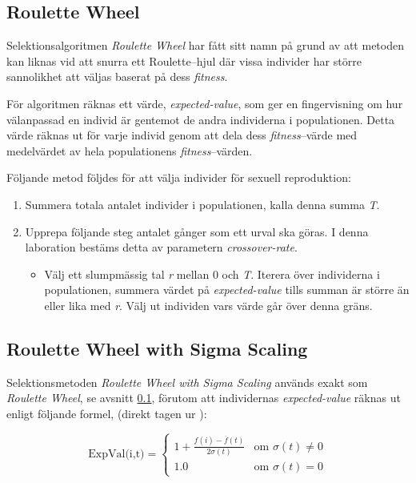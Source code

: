 \documentclass[titlepage, a4paper, 12pt]{article}
\begin{document}
\subsection{Roulette Wheel}\label{sec:roulette-wheel}
Selektionsalgoritmen \textit{Roulette Wheel} har fått sitt namn på
grund av att metoden kan liknas vid att snurra ett Roulette–hjul där
vissa individer har större sannolikhet att väljas baserat på dess
\textit{fitness}.

För algoritmen räknas ett värde, \textit{expected-value}, som ger en
fingervisning om hur välanpassad en individ är gentemot de andra
individerna i populationen. Detta värde räknas ut för varje individ
genom att dela dess \textit{fitness}–värde med medelvärdet av hela
populationens \textit{fitness}–värden.

Följande metod följdes för att välja individer för sexuell
reproduktion:

\begin{enumerate}
\item Summera totala antalet individer i populationen, kalla denna
  summa \textit{T}.
\item Upprepa följande steg antalet gånger som ett urval ska göras. I
  denna laboration bestäms detta av parametern
  \textit{crossover-rate}.
  \begin{itemize}
  \item Välj ett slumpmässig tal \textit{r} mellan 0 och
    \textit{T}. Iterera över individerna i populationen, summera
    värdet på \textit{expected-value} tills summan är större än eller
    lika med \textit{r}. Välj ut individen vars värde går över denna gräns.
  \end{itemize}
\end{enumerate}

\subsection{Roulette Wheel with Sigma Scaling}
Selektionsmetoden \textit{Roulette Wheel with Sigma Scaling} används
exakt som \textit{Roulette Wheel}, se avsnitt
\ref{sec:roulette-wheel}, förutom att individernas
\textit{expected-value} räknas ut enligt följande formel, (direkt
tagen ur \cite{gen-intro}):

\begin{displaymath}
  \textrm{ExpVal(i,t)} = \left\{ \begin{array}{ll}
      1 + \frac{f(i) - \overline{f}(t)}{2\sigma(t)} & \textrm{om } \sigma(t) \neq 0 \\
      1.0 & \textrm{om } \sigma(t) = 0
    \end{array} \right.
\end{displaymath}
  
\end{document}
